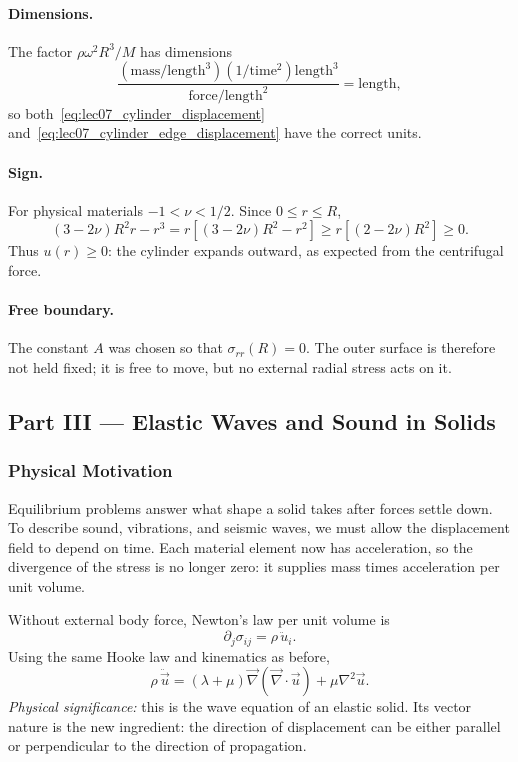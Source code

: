 \documentclass[../main.tex]{subfiles}
\begin{document}
\paragraph{Dimensions.}
The factor $\rho\omega^2R^3/M$ has dimensions
\[
    \frac{(\mathrm{mass}/\mathrm{length}^3)(1/\mathrm{time}^2)\mathrm{length}^3}
         {\mathrm{force}/\mathrm{length}^2}
    =\mathrm{length},
\]
so both~\eqref{eq:lec07_cylinder_displacement} and~\eqref{eq:lec07_cylinder_edge_displacement} have the correct units.

\paragraph{Sign.}
For physical materials $-1<\nu<1/2$. Since $0\le r\le R$,
\[
    (3-2\nu)R^2r-r^3
    =r\left[(3-2\nu)R^2-r^2\right]
    \ge r\left[(2-2\nu)R^2\right]\ge0.
\]
Thus $u(r)\ge0$: the cylinder expands outward, as expected from the centrifugal force.

\paragraph{Free boundary.}
The constant $A$ was chosen so that $\sigma_{rr}(R)=0$. The outer surface is therefore not held fixed; it is free to move, but no external radial stress acts on it.

\subsection*{Part III — Elastic Waves and Sound in Solids}

\subsubsection*{Physical Motivation}
Equilibrium problems answer what shape a solid takes after forces settle down. To describe sound, vibrations, and seismic waves, we must allow the displacement field to depend on time. Each material element now has acceleration, so the divergence of the stress is no longer zero: it supplies mass times acceleration per unit volume.

Without external body force, Newton's law per unit volume is
\begin{equation}
    \partial_j\sigma_{ij}
    = \rho\,\ddot{u}_i.
    \label{eq:lec07_dynamic_balance_components}
\end{equation}
Using the same Hooke law and kinematics as before,
\begin{equation}
    \boxed{
    \rho\,\ddot{\vec{u}}
    =(\lambda+\mu)\vec{\nabla}(\vec{\nabla}\cdot\vec{u})
     +\mu\nabla^2\vec{u}.}
    \label{eq:lec07_elastic_wave_equation}
\end{equation}
\textit{Physical significance:} this is the wave equation of an elastic solid. Its vector nature is the new ingredient: the direction of displacement can be either parallel or perpendicular to the direction of propagation.
\end{document}
